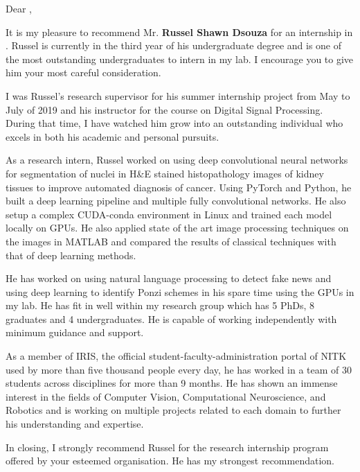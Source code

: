 \documentclass[12pt]{article}
\begin{document}
\noindent
Dear \underline{\hspace{3cm}},

\bigskip
\noindent
It is my pleasure to recommend Mr. \textbf{Russel Shawn Dsouza} for an internship in \underline{\hspace{3cm}}. Russel is currently in the third year of his undergraduate degree and is one of the most outstanding undergraduates to intern in my lab. I encourage you to give him your most careful consideration.

\medskip
\noindent
I was Russel's research supervisor for his summer internship project from May to July of 2019 and his instructor for the course on Digital Signal Processing.
During that time, I have watched him grow into an outstanding individual who excels in both his academic and personal pursuits.

\medskip
\noindent
As a research intern, Russel worked on using deep convolutional neural networks for segmentation of nuclei in H\&E stained histopathology images of kidney tissues to improve automated diagnosis of cancer.
Using PyTorch and Python, he built a deep learning pipeline and multiple fully convolutional networks. He also setup a complex CUDA-conda environment in Linux and trained each model locally on GPUs.
He also applied state of the art image processing techniques on the images in MATLAB and compared the results of classical techniques with that of deep learning methods.

\medskip
\noindent
He has worked on using natural language processing to detect fake news and using deep learning to identify Ponzi schemes in his spare time using the GPUs in my lab.
He has fit in well within my research group which has 5 PhDs, 8 graduates and 4 undergraduates.
He is capable of working independently with minimum guidance and support. 

\medskip
\noindent
As a member of IRIS, the official student-faculty-administration portal of NITK used by more than five thousand people every day, he has worked in a team of 30 students across disciplines for more than 9 months.
He has shown an immense interest in the fields of Computer Vision, Computational Neuroscience, and Robotics and is working on multiple projects related to each domain to further his understanding and expertise.

\medskip
\noindent
In closing, I strongly recommend Russel for the research internship program offered by your esteemed organisation. He has my strongest recommendation.
\end{document}
